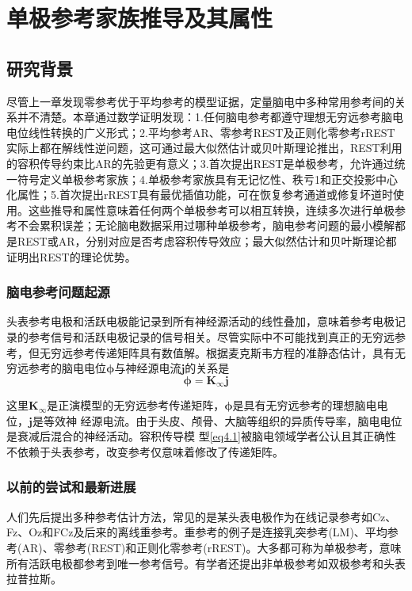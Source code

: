 \chapter{单极参考家族推导及其属性}
\section{研究背景}
尽管上一章发现零参考优于平均参考的模型证据，定量脑电中多种常用参考间的关系并不清楚。本章通过数学证明发现：1.任何脑电参考都遵守理想无穷远参考脑电电位线性转换的广义形式；2.平均参考AR、零参考REST及正则化零参考rREST实际上都在解线性逆问题，这可通过最大似然估计或贝叶斯理论推出，REST利用的容积传导约束比AR的先验更有意义；3.首次提出REST是单极参考，允许通过统一符号定义单极参考家族；4.单极参考家族具有无记忆性、秩亏1和正交投影中心化属性；5.首次提出rREST具有最优插值功能，可在恢复参考通道或修复坏道时使用。这些推导和属性意味着任何两个单极参考可以相互转换，连续多次进行单极参考不会累积误差；无论脑电数据采用过哪种单极参考，脑电参考问题的最小模解都是REST或AR，分别对应是否考虑容积传导效应；最大似然估计和贝叶斯理论都证明出REST的理论优势。

\subsection{脑电参考问题起源}
头表参考电极和活跃电极能记录到所有神经源活动的线性叠加，意味着参考电极记录的参考信号和活跃电极记录的信号相关。尽管实际中不可能找到真正的无穷远参考，但无穷远参考传递矩阵具有数值解。根据麦克斯韦方程的准静态估计，具有无穷远参考的脑电电位$\mathbf{\phi}$与神经源电流$\mathbf{j}$的关系是
\begin{equation}\label{eq4.1}
\mathbf{\phi}=\mathbf{K}_{\infty}\mathbf{j}
\end{equation}

这里$\mathbf{K}_\infty$是正演模型的无穷远参考传递矩阵，$\mathbf{\phi}$是具有无穷远参考的理想脑电电位，$\mathbf{j}$是等效神
经源电流。由于头皮、颅骨、大脑等组织的异质传导率，脑电电位是衰减后混合的神经活动。容积传导模
型\eqref{eq4.1}被脑电领域学者公认且其正确性不依赖于头表参考，改变参考仅意味着修改了传递矩阵。

\subsection{以前的尝试和最新进展}
人们先后提出多种参考估计方法，常见的是某头表电极作为在线记录参考如Cz、Fz、Oz和FCz及后来的离线重参考。重参考的例子是连接乳突参考(LM)、平均参考(AR)、零参考(REST)和正则化零参考(rREST)。大多都可称为单极参考，意味所有活跃电极都参考到唯一参考信号。有学者还提出非单极参考如双极参考和头表拉普拉斯。

